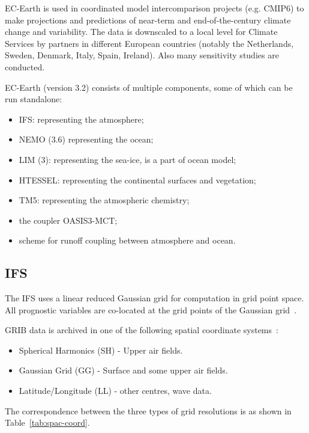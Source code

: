 EC-Earth is used in coordinated model intercomparison projects (e.g. CMIP6) to make projections and predictions 
of near-term and end-of-the-century climate change and variability. The data is downscaled to a local level for 
Climate Services by partners in different European countries (notably the Netherlands, Sweden, Denmark, Italy, Spain, 
Ireland). Also many sensitivity studies are conducted.


EC-Earth (version 3.2) consists of multiple components, some of which can be run standalone:
\begin{itemize}
    \item IFS: representing the atmosphere;
    \item NEMO (3.6) representing the ocean;
    \item LIM (3): representing the sea-ice, is a part of ocean model;
    \item HTESSEL: representing the continental surfaces and vegetation;
    \item TM5: representing the atmospheric chemistry;
    \item the coupler OASIS3-MCT;
    \item scheme for runoff coupling between atmosphere and ocean.
\end{itemize}

\subsection{IFS}
The IFS uses a linear reduced Gaussian grid for computation in grid point space. All prognostic variables are co-located at the grid points of the Gaussian grid~\cite{ifs-meta}.

GRIB data is archived in one of the following spatial coordinate systems~\cite{spatial-ecmwf}:   
\begin{itemize}
    \item Spherical Harmonics (SH) - Upper air fields.
    \item Gaussian Grid (GG) - Surface and some upper air fields.
    \item Latitude/Longitude (LL) - other centres, wave data.
\end{itemize}
The correspondence between the three types of grid resolutions is as shown in Table~\ref{tab:spac-coord}.
    
